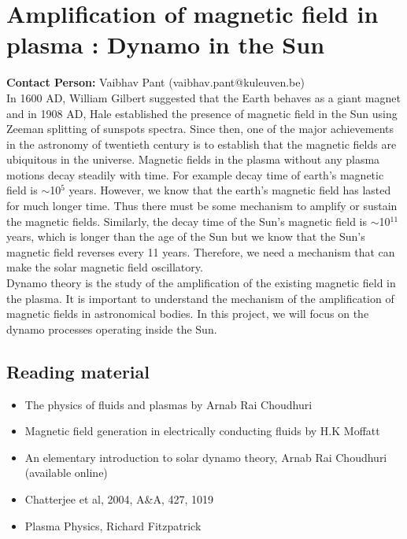 \documentclass[11pt]{article}
\begin{document}
\newpage
\section{Amplification of magnetic field in plasma : Dynamo in the Sun}
 {\bf Contact Person: } Vaibhav Pant (vaibhav.pant@kuleuven.be)\\
 
 
 In 1600 AD, William Gilbert suggested that the Earth behaves as a giant magnet and in 1908 AD, Hale established the presence of magnetic field in the Sun using Zeeman splitting of sunspots spectra. Since then, one of the major achievements in the astronomy of twentieth century is to establish that the magnetic fields are ubiquitous in the universe. Magnetic fields in the plasma without any plasma motions decay steadily with time. For example decay time of earth's magnetic field is $\sim$10$^{5}$ years. However, we know that the earth's magnetic field has lasted for much longer time. Thus there must be some mechanism to amplify or sustain the magnetic fields. Similarly, the decay time of the Sun's magnetic field is $\sim$10$^{11}$ years, which is longer than the age of the Sun but we know that the Sun's magnetic field reverses every 11 years. Therefore, we need a mechanism that can make the solar magnetic field oscillatory.\\
 Dynamo theory is the study of the amplification of the existing magnetic field in the plasma. It is important to understand the mechanism of the amplification of magnetic fields in astronomical bodies. In this project, we will focus on the dynamo processes operating inside the Sun.
\subsection{Reading material}
\begin{itemize}
\item The physics of fluids and plasmas by Arnab Rai Choudhuri
\item Magnetic field generation in electrically conducting fluids by H.K Moffatt
\item An elementary introduction to solar dynamo theory, Arnab Rai Choudhuri (available online)
\item Chatterjee et al, 2004, A\&A, 427, 1019
\item Plasma Physics, Richard Fitzpatrick
\end{itemize}
\end{document}
